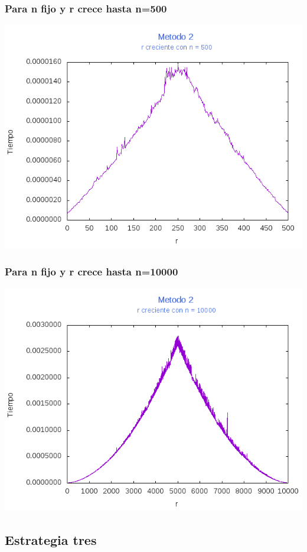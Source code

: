 \documentclass[12pt,letterpaper]{scrartcl}
\begin{document}
\subsubsection{Para n fijo y r crece hasta n=500}
\includegraphics[scale=1]{Metodo2/plot500m2}

\subsubsection{Para n fijo y r crece hasta n=10000}
\includegraphics[scale=1]{Metodo2/plot10000m2}

\newpage

\subsection{Estrategia tres}
\end{document}
